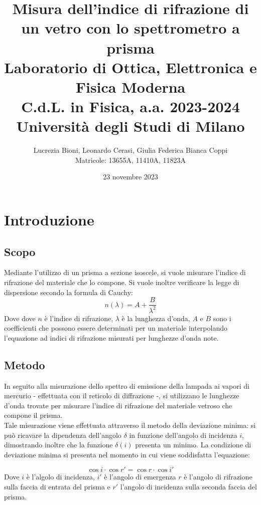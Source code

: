\documentclass[]{article}
\title{%
    \Huge Misura dell'indice di rifrazione di un vetro con lo spettrometro a prisma \\
    \Large Laboratorio di Ottica, Elettronica e Fisica Moderna \\ C.d.L. in Fisica, a.a. 2023-2024 \\ Università degli Studi di Milano}
\author{\LARGE Lucrezia Bioni, Leonardo Cerasi, Giulia Federica Bianca Coppi \\ Matricole: 13655A, 11410A, 11823A}
\date{23 novembre 2023}
\let\oldsection\section%
\renewcommand{\section}{%
	\renewcommand{\theequation}{\thesection.\arabic{equation}}%
	\oldsection}%
\let\oldsubsection\subsection%
\renewcommand{\subsection}{%
	\renewcommand{\theequation}{\thesubsection.\arabic{equation}}%
	\oldsubsection}%
\begin{document}
    \maketitle

    \section{Introduzione}

    \subsection{Scopo}

    Mediante l'utilizzo di un prisma a sezione isoscele, si vuole misurare l'indice di rifrazione del materiale che lo compone. Si vuole inoltre verificare la legge di dispersione secondo la formula di Cauchy:
    \begin{equation}
        \label{cauchy}
        n(\lambda) = A + \frac{B}{\lambda^2}
    \end{equation}
    Dove dove $n$ è l'indice di rifrazione, $\lambda$ è la lunghezza d'onda, $A$ e $B$ sono i coefficienti che possono essere determinati per un materiale interpolando l'equazione ad indici di rifrazione misurati per lunghezze d'onda note.

    \subsection{Metodo}

    In seguito alla misurazione dello spettro di emissione della lampada ai vapori di mercurio - effettuata con il reticolo di diffrazione -, si utilizzano le lunghezze d'onda trovate per misurare l'indice di rifrazione del materiale vetroso che compone il prisma. \\
    Tale misurazione viene effettuata attraverso il metodo della deviazione minima: si può ricavare la dipendenza dell'angolo $\delta$ in funzione dell'angolo di incidenza $i$, dimostrando inoltre che la funzione $\delta (i)$ presenta un minimo. La condizione di deviazione minima si presenta nel momento in cui viene soddisfatta l'equazione:

    \begin{equation}
        \label{dev_minima}
        \cos i \cdot \cos r' = \cos r \cdot \cos i'
    \end{equation}
    Dove $i$ è l'algolo di incidenza, $i'$ è l'angolo di emergenza $r$ è l'angolo di rifrazione sulla faccia di entrata del prisma e $r'$ l'angolo di incidenza sulla seconda faccia del prisma.
\end{document}

